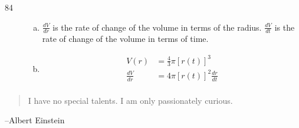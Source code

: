 \documentclass[letterpaper, landscape]{exam}
\begin{document}
\begin{description}
    \item[84] 
      \begin{enumerate}[(a)]
        \item $\frac{dV}{dr}$ is the rate of change of the volume in terms of the radius.
          $\frac{dV}{dt}$ is the rate of change of the volume in terms of time.

        \item
          \begin{align*}
            V(r)          & = \frac{4}{3} \pi [r(t)]^3 \\
            \frac{dV}{dr} & = \boxed{ 4 \pi [r(t)]^2 \frac{dr}{dt} } \\
          \end{align*}
      \end{enumerate}
      
  \end{description}

  \else
    \vspace{10 cm}
    \begin{quote}
      \begin{em}
        I have no special talents. I am only passionately curious. 
      \end{em}
    \end{quote}
    \hspace{2 cm} --Albert Einstein
  \fi
\end{document}
